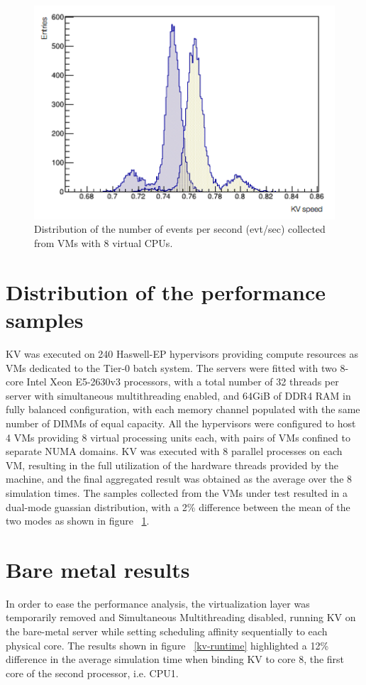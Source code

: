 \documentclass[a4paper]{jpconf}
\begin{document}
\begin{figure}
\begin{center}
\includegraphics[scale=0.5]{images/dual-mode-gaussian.png}
\end{center}
\caption{\label{dual-mode-gaussian} Distribution of the number of events per 
second (evt/sec) collected from VMs with 8 virtual CPUs. }
\end{figure}

\section{Distribution of the performance samples}
KV was executed on 240 Haswell-EP hypervisors providing compute
resources as VMs dedicated to the Tier-0 batch system. The servers were
fitted with two 8-core Intel Xeon E5-2630v3 processors, with a total number  
of 32 threads per server with simultaneous multithreading enabled, and 64GiB    
of DDR4 RAM in fully balanced configuration, with each memory channel populated with
the same number of DIMMs of equal capacity. All the hypervisors were configured 
to host 4 VMs providing 8 virtual processing units each, with pairs of VMs 
confined to separate NUMA domains. KV was executed with 8 parallel processes 
on each VM, resulting in the full utilization of the hardware threads provided
by the machine, and the final aggregated result was obtained as the average over 
the 8 simulation times. The samples collected from the VMs under test resulted in a 
dual-mode guassian distribution, with a 2\% difference between the 
mean of the two modes as shown in figure 
~\ref{dual-mode-gaussian}.

\section{Bare metal results}
In order to ease the performance analysis, the virtualization layer was
temporarily removed and Simultaneous Multithreading disabled, running KV on 
the bare-metal server while setting scheduling affinity sequentially to each physical
core. The results shown
in figure ~\ref{kv-runtime} highlighted a 12\% difference in the average simulation
time when binding KV to core 8, the first core of the second processor, i.e. CPU1.
\end{document}
